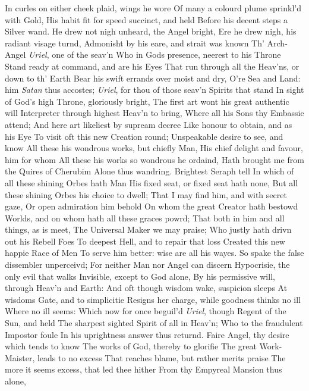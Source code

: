 \documentclass[11pt]{book}
\newcounter {first}
\begin{document}
In curles on either cheek plaid, wings he wore 
Of many a colourd plume sprinkl'd with Gold, 
His habit fit for speed succinct, and held 
Before his decent steps a Silver wand. 
He drew not nigh unheard, the Angel bright, 
Ere he drew nigh, his radiant visage turnd, 
Admonisht by his eare, and strait was known 
Th' Arch-Angel \textit{Uriel}, one of the seav'n 
Who in Gods presence, neerest to his Throne 
Stand ready at command, and are his Eyes 
That run through all the Heav'ns, or down to th' Earth 
Bear his swift errands over moist and dry, 
O're Sea and Land: him \textit{Satan} thus accostes; 
\quad \textit{Uriel}, for thou of those seav'n Spirits that stand 
In sight of God's high Throne, gloriously bright, 
The first art wont his great authentic will 
Interpreter through highest Heav'n to bring, 
Where all his Sons thy Embassie attend; 
And here art likeliest by supream decree 
Like honour to obtain, and as his Eye 
To visit oft this new Creation round; 
Unspeakable desire to see, and know 
All these his wondrous works, but chiefly Man, 
His chief delight and favour, him for whom 
All these his works so wondrous he ordaind, 
Hath brought me from the Quires of Cherubim 
Alone thus wandring.  Brightest Seraph tell 
In which of all these shining Orbes hath Man 
His fixed seat, or fixed seat hath none, 
But all these shining Orbes his choice to dwell; 
That I may find him, and with secret gaze, 
Or open admiration him behold 
On whom the great Creator hath bestowd 
Worlds, and on whom hath all these graces powrd; 
That both in him and all things, as is meet, 
The Universal Maker we may praise; 
Who justly hath drivn out his Rebell Foes 
To deepest Hell, and to repair that loss 
Created this new happie Race of Men 
To serve him better: wise are all his wayes. 
\quad So spake the false dissembler unperceivd; 
For neither Man nor Angel can discern 
Hypocrisie, the only evil that walks 
Invisible, except to God alone, 
By his permissive will, through Heav'n and Earth: 
And oft though wisdom wake, suspicion sleeps 
At wisdoms Gate, and to simplicitie 
Resigns her charge, while goodness thinks no ill 
Where no ill seems: Which now for once beguil'd 
\textit{Uriel}, though Regent of the Sun, and held 
The sharpest sighted Spirit of all in Heav'n; 
Who to the fraudulent Impostor foule 
In his uprightness answer thus returnd. 
Faire Angel, thy desire which tends to know 
The works of God, thereby to glorifie 
The great Work-Maister, leads to no excess 
That reaches blame, but rather merits praise 
The more it seems excess, that led thee hither 
From thy Empyreal Mansion thus alone, 
\end{document}
